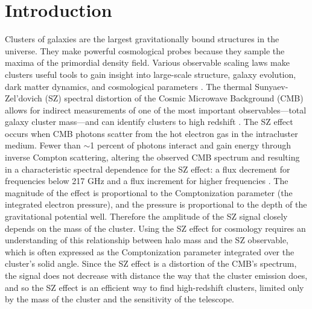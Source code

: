 \documentclass[a4paper,fleqn,usenatbib]{mnras}
\begin{document}
\begin{keywords}

\end{keywords}




\section{Introduction}
Clusters of galaxies are the largest gravitationally bound structures in the universe. They make powerful cosmological probes because they sample the maxima of the primordial density field.  Various observable scaling laws make clusters useful tools to gain insight into large-scale structure, galaxy evolution, dark matter dynamics, and cosmological parameters \citep{2005RvMP...77..207V,2013SSRv..177..247G}. The thermal Sunyaev-Zel'dovich (SZ) spectral distortion of the Cosmic Microwave Background (CMB) allows for indirect measurements of one of the most important observables---total galaxy cluster mass---and can identify clusters to high redshift \citep{1972CoASP...4..173S, 2002ARA&A..40..643C}. 
The SZ effect occurs when CMB photons scatter from the hot electron gas in the intracluster medium. Fewer than $\sim$1 percent of photons interact and gain energy through inverse Compton scattering, altering the observed CMB spectrum and resulting in a characteristic spectral dependence for the SZ effect: a flux decrement for frequencies below 217 GHz and a flux increment for higher frequencies \citep{1999PhR...310...97B,2002ARA&A..40..643C}.
The magnitude of the effect is proportional to the Comptonization parameter (the integrated electron pressure), and the pressure is proportional to the depth of the gravitational potential well.  Therefore the amplitude of the SZ signal closely depends on the mass of the cluster.
Using the SZ effect for cosmology requires an understanding of this relationship between halo mass and the SZ observable, which is often expressed as the Comptonization parameter integrated over the cluster's solid angle. 
Since the SZ effect is a distortion of the CMB's spectrum, the signal does not decrease with distance the way that the cluster emission does, and so the SZ effect is an efficient way to find high-redshift clusters, limited only by the mass of the cluster and the sensitivity of the telescope.
\end{document}
